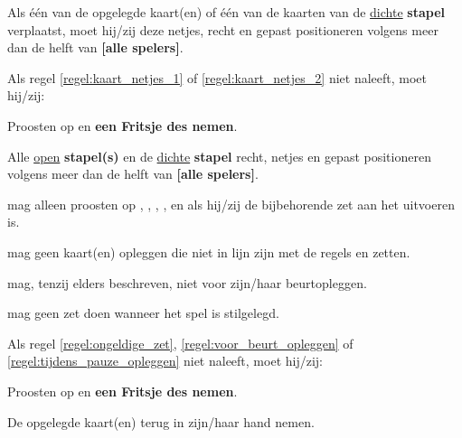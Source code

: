 \vervolgLijst{}
    \item Als \eenSpeler één van de opgelegde kaart(en) of één van de kaarten van de \ul{dichte} \textbf{stapel} verplaatst, moet hij/zij deze netjes, recht en gepast positioneren volgens meer dan de helft van \textbf{[alle spelers]}.
    \label{regel:kaart_netjes_2} 
\eindLijst{}

\vervolgLijst{}
    \item Als \eenSpeler regel \ref{regel:kaart_netjes_1} of \ref{regel:kaart_netjes_2} niet naleeft, moet hij/zij:
    \puntLijst{}
        \item Proosten op  en \textbf{een Fritsje des nemen}\footnotemark[1].
        \item Alle \ul{open} \textbf{stapel(s)} en de \ul{dichte} \textbf{stapel} recht, netjes en gepast positioneren volgens meer dan de helft van \textbf{[alle spelers]}. 
    \eindPuntLijst{}
\eindLijst{}


\vervolgLijst{}
    \item \EenSpeler mag alleen proosten op , , , ,  en  als hij/zij de bijbehorende zet aan het uitvoeren is\footnotemark[2]. 
\eindLijst{}


\vervolgLijst{}
    \item \EenSpeler mag geen kaart(en) opleggen die niet in lijn zijn met de regels en zetten.
    \label{regel:ongeldige_zet}
\eindLijst{}

\vervolgLijst{}
    \item \EenSpeler mag, tenzij elders beschreven, niet voor zijn/haar beurt\footnotemark[3] opleggen.
    \label{regel:voor_beurt_opleggen}
\eindLijst{}

\vervolgLijst{}
    \item \EenSpeler mag geen zet doen wanneer het spel is stilgelegd.
    \label{regel:tijdens_pauze_opleggen}
\eindLijst{}

\vervolgLijst{}
    \item Als \eenSpeler regel \ref{regel:ongeldige_zet}, \ref{regel:voor_beurt_opleggen} of \ref{regel:tijdens_pauze_opleggen} niet naleeft, moet hij/zij:
    \puntLijst{}
        \item Proosten op  en \textbf{een Fritsje des nemen}\footnotemark[1].
        \item De opgelegde kaart(en) terug in zijn/haar hand nemen.
    \eindPuntLijst{}
    \label{regel:kaarten_terugnemen_2}
\eindLijst{}

